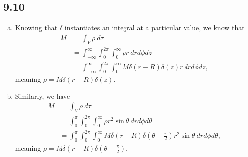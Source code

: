 \documentclass[10pt]{mypackage}
\newcommand{\df}{\delta\!}
\begin{document}
\subsection{9.10}%
\begin{enumerate}[(a)]
  \item Knowing that $\delta$ instantiates an integral at a particular value, we know that
    \begin{align*}
      M &= \int_{V}^{} \rho\:d\tau\\
        &= \int_{-\infty}^{\infty}\int_{0}^{2\pi}\int_{0}^{\infty}\rho r\:drd\phi dz\\
        &= \int_{-\infty}^{\infty}\int_{0}^{2\pi}\int_{0}^{\infty}M\df\left(r-R\right)\df\left(z\right)r\:drd\phi dz,
    \end{align*}
    meaning $\rho = M\df\left(r-R\right)\df\left(z\right)$.
  \item Similarly, we have
    \begin{align*}
      M &= \int_{V}^{} \rho\:d\tau\\
        &= \int_{0}^{\pi}\int_{0}^{2\pi}\int_{0}^{\infty}\rho r^2\sin\theta\:drd\phi d\theta\\
        &= \int_{0}^{\pi}\int_{0}^{2\pi}\int_{0}^{\infty}M\df\left(r-R\right)\df\left(\theta - \frac{\pi}{2}\right) r^2\sin\theta\:dr d\phi d\theta,
    \end{align*}
    meaning $\rho = M\df\left(r-R\right)\df\left(\theta - \frac{\pi}{2}\right)$.
\end{enumerate}
\end{document}
